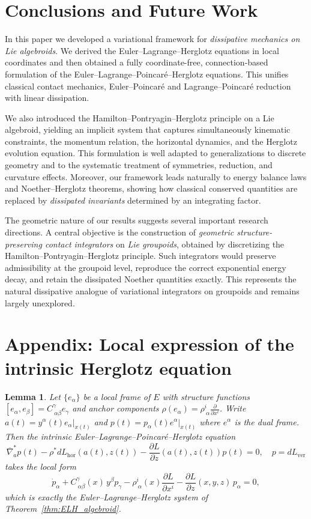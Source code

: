 \documentclass[11pt,a4paper]{article}
\newtheorem{lemma}[theorem]{Lemma}
\theoremstyle{definition}
\begin{document}
\section{Conclusions and Future Work}

In this paper we developed a variational framework for \emph{dissipative mechanics on Lie algebroids}. We derived the Euler--Lagrange--Herglotz equations in local coordinates and then obtained a fully coordinate-free, connection-based formulation of the Euler--Lagrange--Poincar\'e--Herglotz equations. This unifies classical contact mechanics, Euler--Poincar\'e and Lagrange--Poincar\'e reduction with linear dissipation.

We also introduced the Hamilton--Pontryagin--Herglotz principle on a Lie algebroid, yielding an implicit system that captures simultaneously kinematic constraints, the momentum relation, the horizontal dynamics, and the Herglotz evolution equation. This formulation is well adapted to generalizations to discrete geometry and to the systematic treatment of symmetries, reduction, and curvature effects. Moreover, our framework leads naturally to energy balance laws and Noether--Herglotz theorems, showing how classical conserved quantities are replaced by \emph{dissipated invariants} determined by an integrating factor.

The geometric nature of our results suggests several important research directions. A central objective is the construction of \emph{geometric structure-preserving contact integrators} on \emph{Lie groupoids}, obtained by discretizing the Hamilton--Pontryagin--Herglotz principle. Such integrators would preserve admissibility at the groupoid level, reproduce the correct exponential energy decay, and retain the dissipated Noether quantities exactly. This represents the natural dissipative analogue of variational integrators on groupoids and remains largely unexplored.


\appendix

\section{Appendix: Local expression of the intrinsic Herglotz equation}

\begin{lemma}\label{lem:local_ELP_Herglotz}
Let $\{e_\alpha\}$ be a local frame of $E$ with structure functions
$[e_\alpha,e_\beta]=C^\gamma_{\ \alpha\beta}e_\gamma$ and anchor
components $\rho(e_\alpha)=\rho^i_{\ \alpha}\frac{\partial}{\partial x^{i}}$.
Write $a(t)=y^\alpha(t)e_\alpha|_{x(t)}$ and
$p(t)=p_\alpha(t)e^\alpha|_{x(t)}$ where $e^\alpha$ is the dual frame.
Then the intrinsic Euler--Lagrange--Poincar\'e--Herglotz equation
\[
\overline{\nabla}_{a}^{*}p (t) - \rho^{*}dL_{\mathrm{hor}}(a(t),z(t))  - \frac{\partial L}{\partial z}(a(t),z(t)) p(t) = 0, \quad p=dL_{\mathrm{ver}}
\]
takes the local form
\[
\dot p_\alpha
+ C^\gamma_{\ \alpha\beta}(x)\,y^\beta p_\gamma
-
\rho^i_{\ \alpha}(x)\frac{\partial L}{\partial x^i}
-\frac{\partial L}{\partial z}(x,y,z)\,p_\alpha = 0,
\]
which is exactly the Euler--Lagrange--Herglotz system of
Theorem~\ref{thm:ELH_algebroid}.
\end{lemma}
\end{document}
